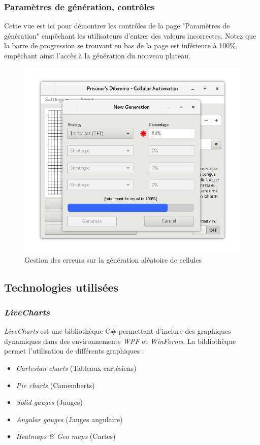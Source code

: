 \documentclass[a4paper, french]{article}
\begin{document}
\pagebreak
\subsubsection{Paramètres de génération, contrôles}
Cette vue est ici pour démontrer les contrôles de la page "Paramètres de génération" empêchant les utilisateurs d'entrer des valeurs incorrectes. Notez que la barre de progression se trouvant en bas de la page est inférieure à 100\%, empêchant ainsi l'accès à la génération du nouveau plateau.

\vfill
\begin{figure}[htp]
    \centering
    \includegraphics[width=12cm]{interface/generationsettingsinvalid.png}
    \caption{Gestion des erreurs sur la génération aléatoire de cellules}
\end{figure}
\vfill
\pagebreak

\subsection{Technologies utilisées}
\subsubsection{\textit{LiveCharts}}
\textit{LiveCharts} est une bibliothèque C\# permettant d'inclure des graphiques dynamiques dans des environnements \textit{WPF} et \textit{WinForms}. La bibliothèque permet l'utilisation de différents graphiques :

\begin{itemize}
    \item \textit{Cartesian charts} (Tableaux cartésiens)
    \item \textit{Pie charts} (Camemberts)
    \item \textit{Solid gauges} (Jauges)
    \item \textit{Angular gauges} (Jauges angulaire)
    \item \textit{Heatmaps \& Geo maps} (Cartes)
\end{itemize}
\end{document}
